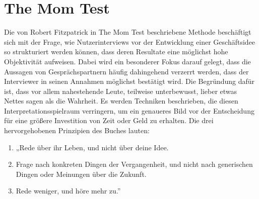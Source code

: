 \section{The Mom Test}
\label{sec:mom}
Die von Robert Fitzpatrick in The Mom Test \cite[vgl.][]{fitzpatrick2013mom} beschriebene Methode beschäftigt sich mit der Frage, wie Nutzerinterviews vor der Entwicklung einer Geschäftsidee so strukturiert werden können, dass deren Resultate eine möglichst hohe Objektivität aufweisen. Dabei wird ein besonderer Fokus darauf gelegt, dass die Aussagen von Gesprächspartnern häufig dahingehend verzerrt werden, dass der Interviewer in seinen Annahmen möglichst bestätigt wird. Die Begründung dafür ist, dass vor allem nahestehende Leute, teilweise unterbewusst, lieber etwas Nettes sagen als die Wahrheit. Es werden Techniken beschrieben, die diesen Interpretationsspielraum verringern, um ein genaueres Bild vor der Entscheidung für eine größere Investition von Zeit oder Geld zu erhalten. Die drei hervorgehobenen Prinzipien des Buches lauten:

\begin{enumerate}
    \item „Rede über ihr Leben, und nicht über deine Idee.
    \item Frage nach konkreten Dingen der Vergangenheit, und nicht nach generischen Dingen oder Meinungen über die Zukunft.
    \item Rede weniger, und höre mehr zu.” \cite[S. 128]{fitzpatrick2013mom}
\end{enumerate}

